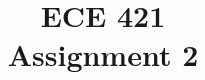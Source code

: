 \documentclass[letterpaper]{article}
\title{ECE 421 \\
Assignment 2}
\author{\ME}
\begin{document}
\maketitle %

\section{}
\inputminted[firstline=2, lastline=4]{rust}{1.rs}

\section{}
\inputminted[firstline=5, lastline=8]{rust}{2.rs}

\section{}
\inputminted[]{rust}{3.rs}

\section{}
\inputminted[]{rust}{4.rs}

\section{}
\inputminted[]{rust}{5.rs}

\section{}


\section{}


\section{}


\section{}

\end{document}
